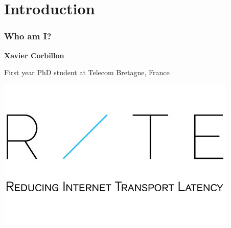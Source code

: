 \section*{ Introduction}

\begin{frame}[c]
   \frametitle{Who am I?}

   \textbf{Xavier Corbillon}

   First year PhD student at Telecom Bretagne, France

   \includegraphics[scale=0.25]{plots/pictures/Xavier/ritelogo.jpg}


\end{frame}

